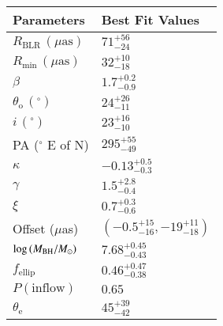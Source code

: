 \begin{table}
\centering
\renewcommand{\arraystretch}{1.5}
\begin{tabular}{p{} | >{\centering\arraybackslash}p{}}
\hline\hline
                          Parameters &        Best Fit Values                        \\ \hline 
$R_\mathrm{BLR}\,(\mu\mathrm{as})$   & $71_{-24}^{+56}$                             \\   
$R_\mathrm{min}\,(\mu\mathrm{as})$   & $32_{-18}^{+10}$                              \\
$\beta$                              & $1.7_{-0.9}^{+0.2}$                        \\ 
$\theta_\mathrm{o}\,(^\circ)$        & $24_{-11}^{+26}$                              \\ 
$i\,(^\circ)$                        & $23_{-10}^{+16}$                               \\ 
PA ($^\circ$ E of N)                 & $295_{-49}^{+55}$                             \\ 
$\kappa$                             & $-0.13_{-0.3}^{+0.5}$                                     \\            
$\gamma$                             & $1.5_{-0.4}^{+2.8}$                                       \\         
$\xi$                                & $0.7_{-0.6}^{+0.3}$                                       \\       
Offset ($\mu$as)                     & $\left(-0.5_{-16}^{+15}, -19_{-18}^{+11}\right)$ \\ 
$\log\,({\mbox{$M_\mathrm{BH}$}}/M_\odot)$               & $7.68_{-0.43}^{+0.45}$                         \\ 
$f_\mathrm{ellip}$                   & $0.46_{-0.38}^{+0.47}$                                             \\
$P(\mathrm{inflow})$                 & $0.65$                                       \\
$\theta_\mathrm{e}$                  & $45_{-42}^{+39}$                                       \\

\end{tabular}
\end{table}
